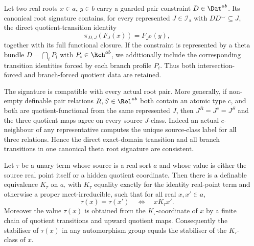 \begin{definition}
\label{def:typed-transition-root-signature}
Let two real roots \(x\in a\), \(y\in b\) carry a guarded pair constraint
\(D\in\Dat^{ab}\).  Its canonical root signature contains, for every
represented \(J\in\mathcal I_a\) with
\(DD^{\smile}\subseteq J\), the direct quotient-transition identity
\[
 \pi_{D,J}(F_J(x))=F_{J^D}(y),
\]
together with its full functional closure.  If the constraint is represented
by a theta bundle
\(D=\bigcap_iP_i\) with \(P_i\in\Rch^{ab}\), we additionally include the
corresponding transition identities forced by each branch profile \(P_i\).
Thus both intersection-forced and branch-forced quotient data are retained.
\end{definition}

The signature is compatible with every actual root pair.  More generally, if
non-empty definable pair relations \(R,S\in\Rel^{ab}\) both contain an
atomic type \(c\), and both are quotient-functional from the same represented
\(J\), then \(J^R=J^c=J^S\) and the three quotient maps agree on every
source \(J\)-class.  Indeed an actual \(c\)-neighbour of any representative
computes the unique source-class label for all three relations.  Hence the
direct exact-domain transition and all branch transitions in one canonical
theta root signature are consistent.

\begin{lemma}
\label{lem:typed-coordinate-normal-form}
Let \(\tau\) be a unary term whose source is a real sort \(a\) and whose
value is either the source real point itself or a hidden quotient coordinate.
Then there is a definable equivalence \(K_\tau\) on \(a\), with
\(K_\tau\) equality exactly for the identity real-point term and otherwise a
proper meet-irreducible, such that for all real \(x,x'\in a\),
\[
 \tau(x)=\tau(x')\quad\Longleftrightarrow\quad xK_\tau x'.
\tag{QT-NF}\label{eq:typed-coordinate-normal-form}
\]
Moreover the value \(\tau(x)\) is obtained from the
\(K_\tau\)-coordinate of \(x\) by a finite chain of quotient transitions and upward quotient maps.
Consequently the stabiliser of \(\tau(x)\) in any automorphism group equals
the stabiliser of the \(K_\tau\)-class of \(x\).
\end{lemma}


